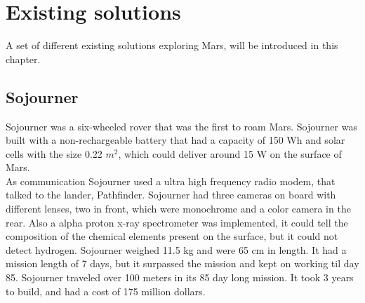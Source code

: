\chapter{Existing solutions}\label{ch:existingSolutions}

A set of different existing solutions exploring Mars, will be introduced in this chapter.

\section{Sojourner}\label{ch:existingSolutions_SojournerRover}
Sojourner was a six-wheeled rover that was the first to roam Mars.
Sojourner was built with a non-rechargeable battery that had a capacity of 150 Wh and solar cells with the size 0.22 \begin{math}m^2\end{math}, which could deliver around 15 W on the surface of Mars.\\ As communication Sojourner used a ultra high frequency radio modem, that talked to the lander, Pathfinder. Sojourner had three cameras on board with different lenses, two in front, which were monochrome and a color camera in the rear. Also a alpha proton x-ray spectrometer was implemented, it could tell the composition of the chemical elements present on the surface, but it could not detect hydrogen. Sojourner weighed 11.5 kg and were 65 cm in length. It had a mission length of 7 days, but it surpassed the mission and kept on working til day 85. Sojourner traveled over 100 meters in its 85 day long mission. It took 3 years to build, and had a cost of 175 million dollars\cite{Sojounerroverjpl}.

